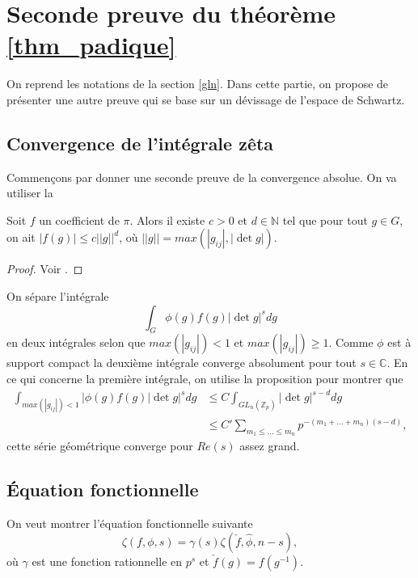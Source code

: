 \section{Seconde preuve du théorème \ref{thm_padique}}

On reprend les notations de la section \ref{gln}. Dans cette partie, on propose de présenter une autre preuve qui se base sur un dévissage de l'espace de Schwartz.

\subsection{Convergence de l'intégrale zêta}

Commençons par donner une seconde preuve de la convergence absolue. On va utiliser la
\begin{proposition}
Soit $f$ un coefficient de $\pi$. Alors il existe $c > 0$ et $d \in \mathbb{N}$ tel que pour tout $g \in G$, on ait $|f(g)| \leq c ||g||^d$, où $||g|| = max(|g_{ij}|, |\det g|)$.
\end{proposition}

\begin{proof}
Voir \cite[Corollaire I.4.4]{waldspurger}.
\end{proof}

On sépare l'intégrale
\begin{equation}
\int_G \phi(g)f(g)|\det g|^s dg
\end{equation}
en deux intégrales selon que $max(|g_{ij}|) < 1$ et $max(|g_{ij}|) \geq 1$. Comme $\phi$ est à support compact la deuxième intégrale converge absolument pour tout $s \in \mathbb{C}$. En ce qui concerne la première intégrale, on utilise la proposition pour montrer que
\begin{align}
\int_{max(|g_{ij}|) < 1}|\phi(g)f(g)|\det g|^s dg &\leq C \int_{GL_n(\mathbb{Z}_p)} |\det g|^{s-d} dg \\
&\leq C' \sum_{m_1 \leq ... \leq m_n} p^{-(m_1+...+m_n)(s-d)},
\end{align}
cette série géométrique converge pour $Re(s)$ assez grand.

\subsection{Équation fonctionnelle}
On veut montrer l'équation fonctionnelle suivante
\begin{equation}
\zeta(f, \phi, s) = \gamma(s) \zeta(\check{f}, \hat{\phi}, n-s),
\end{equation}
où $\gamma$ est une fonction rationnelle en $p^s$ et $\check{f}(g) = f(g^{-1})$.

